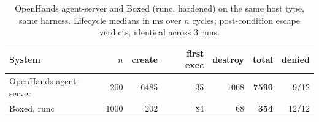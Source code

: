 \begin{table}[t]
\centering
\caption{OpenHands agent-server and Boxed (runc, hardened) on the same host type, same harness. Lifecycle medians in ms over $n$ cycles; post-condition escape verdicts, identical across 3 runs.}
\label{tab:openhands}
\scriptsize
\setlength{\tabcolsep}{2.5pt}
\begin{tabular}{@{}lrrrrrr@{}}
\toprule
System & $n$ & create & first exec & destroy & total & denied \\
\midrule
OpenHands agent-server & 200 & 6485 & 35 & 1068 & \textbf{7590} & 9/12 \\
Boxed, runc & 1000 & 202 & 84 & 68 & \textbf{354} & 12/12 \\
\bottomrule
\end{tabular}
\end{table}
